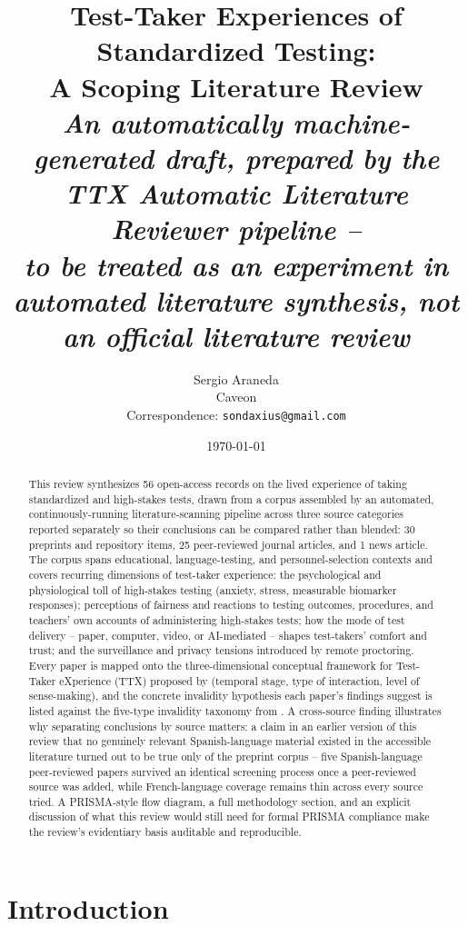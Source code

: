 \documentclass[11pt]{article}
\title{Test-Taker Experiences of Standardized Testing:\\ A Scoping Literature Review\\[6pt]
\large\textit{An automatically machine-generated draft, prepared by the TTX Automatic Literature Reviewer pipeline --\\ to be treated as an experiment in automated literature synthesis, not an official literature review}}
\author{Sergio Araneda \\ Caveon \\ Correspondence: \texttt{sondaxius@gmail.com}}
\date{\today}
\begin{document}
\maketitle

\begin{abstract}
\noindent This review synthesizes 56 open-access records on the lived experience of taking standardized and high-stakes tests, drawn from a corpus assembled by an automated, continuously-running literature-scanning pipeline across three source categories reported separately so their conclusions can be compared rather than blended: 30 preprints and repository items, 25 peer-reviewed journal articles, and 1 news article. The corpus spans educational, language-testing, and personnel-selection contexts and covers recurring dimensions of test-taker experience: the psychological and physiological toll of high-stakes testing (anxiety, stress, measurable biomarker responses); perceptions of fairness and reactions to testing outcomes, procedures, and teachers' own accounts of administering high-stakes tests; how the mode of test delivery -- paper, computer, video, or AI-mediated -- shapes test-takers' comfort and trust; and the surveillance and privacy tensions introduced by remote proctoring. Every paper is mapped onto the three-dimensional conceptual framework for Test-Taker eXperience (TTX) proposed by \citet{araneda2025ttxmodel} (temporal stage, type of interaction, level of sense-making), and the concrete invalidity hypothesis each paper's findings suggest is listed against the five-type invalidity taxonomy from \citet{araneda2023dissertation}. A cross-source finding illustrates why separating conclusions by source matters: a claim in an earlier version of this review that no genuinely relevant Spanish-language material existed in the accessible literature turned out to be true only of the preprint corpus -- five Spanish-language peer-reviewed papers survived an identical screening process once a peer-reviewed source was added, while French-language coverage remains thin across every source tried. A PRISMA-style flow diagram, a full methodology section, and an explicit discussion of what this review would still need for formal PRISMA compliance make the review's evidentiary basis auditable and reproducible.
\end{abstract}

\section{Introduction}
\end{document}
